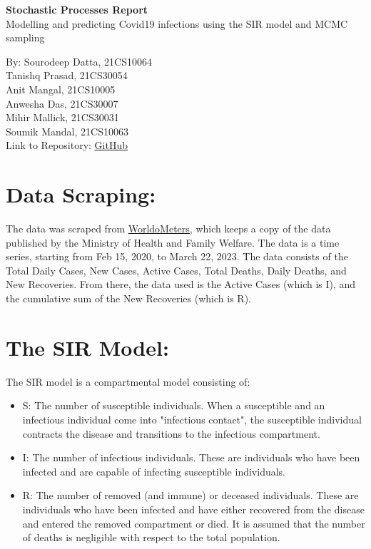 \documentclass[letterpaper,12pt]{report}
\begin{document}
{\centering
    \textbf{\Huge{Stochastic Processes Report}} \\ \vspace{5pt}
    \Large{Modelling and predicting Covid19 infections using the SIR model and MCMC sampling} \\
}
\begin{flushright}
\small{By: Sourodeep Datta, 21CS10064\\
Tanishq Prasad, 21CS30054\\
Anit Mangal, 21CS10005\\
Anwesha Das, 21CS30007\\
Mihir Mallick, 21CS30031\\
Soumik Mandal, 21CS10063}\\
Link to Repository: \href{https://github.com/TheLapisGoat/SIR-Model-with-MCMC-Analysis}{GitHub}
\end{flushright}

\section*{\large Data Scraping: } \vspace{-10pt}
The data was scraped from \href{https://www.worldometers.info/coronavirus/country/india/}{\color{Blue} WorldoMeters}, which keeps a copy of the data published by the Ministry of Health and Family Welfare. The data is a time series, starting from Feb 15, 2020, to March 22, 2023. The data consists of the Total Daily Cases, New Cases, Active Cases, Total Deaths, Daily Deaths, and New Recoveries. From there, the data used is the Active Cases (which is I), and the cumulative sum of the New Recoveries (which is R).
\vspace{-10pt}
\section*{\large The SIR Model:} \vspace{-10pt}
The SIR model is a compartmental model consisting of:\vspace{-5pt}
\begin{itemize}
    \item {S: The number of susceptible individuals. When a susceptible and an infectious individual come into "infectious contact", the susceptible individual contracts the disease and transitions to the infectious compartment.
    }\vspace{-5pt}
    \item {I: The number of infectious individuals. These are individuals who have been infected and are capable of infecting susceptible individuals.
    }\vspace{-5pt}
    \item {R: The number of removed (and immune) or deceased individuals. These are individuals who have been infected and have either recovered from the disease and entered the removed compartment or died. It is assumed that the number of deaths is negligible with respect to the total population.
    }
\end{itemize}\vspace{-5pt}
\end{document}
